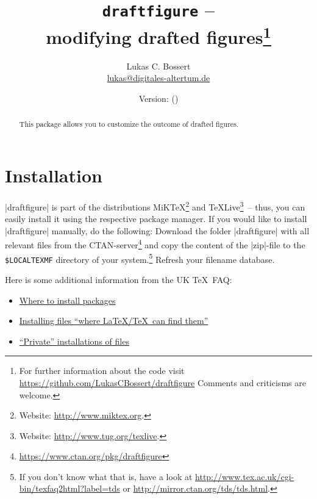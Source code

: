 \documentclass[a4paper,
10pt,
english
]{ltxdoc}
\newcommand\df{draftfigure\xspace}
\newcommand\dfstring{|draftfigure|\xspace}
\begin{document}


\title{\texttt{\df} -- \\ modifying drafted figures\footnote{%
For further information about the code visit \href{https://github.com/LukasCBossert/draftfigure}{https://github.com/LukasCBossert/draftfigure}
Comments and criticisms are welcome.}}
\author{Lukas C. Bossert\\{\small \href{mailto:lukas@digitales-altertum.de}{lukas@digitales-altertum.de}}}
\date{Version: \dfdate{} (\dfversion)} 
\maketitle

\begin{abstract}
\noindent This package allows you to customize the outcome of drafted figures.
\end{abstract}


\begin{multicols}{2}
\footnotesize\parskip=0mm \tableofcontents
\end{multicols}

\section{Installation}
\dfstring is part of the distributions MiK\TeX \footnote{Website: \url{http://www.miktex.org}.} 
and \TeX Live\footnote{Website: \url{http://www.tug.org/texlive}.}~-- thus, you
can easily install it using the respective package manager. 
If you would like to
install \dfstring manually, do the following:
Download the folder \dfstring with all relevant files from the CTAN-server\footnote{\url{https://www.ctan.org/pkg/\df}} and copy the content of the |zip|-file to the \texttt{\$LOCALTEXMF} directory of
 your system.\footnote{If you don't know what that is, have a look at
\url{http://www.tex.ac.uk/cgi-bin/texfaq2html?label=tds} or 
\url{http://mirror.ctan.org/tds/tds.html}.} 
Refresh your filename database.

Here is some additional information from the UK \TeX\ FAQ:
\begin{itemize}[nosep,after=\vspace{-\baselineskip} ]
  \item \href{%
    http://www.tex.ac.uk/cgi-bin/texfaq2html?label=install-where}{%
    Where to install packages}
  \item \href{%
    http://www.tex.ac.uk/cgi-bin/texfaq2html?label=inst-wlcf}{%
    Installing files \enquote{where \LaTeX /TeX\ can find them}}
  \item \href{%
    http://www.tex.ac.uk/cgi-bin/texfaq2html?label=privinst}{%
    \enquote{Private} installations of files}
\end{itemize}
\end{document}
